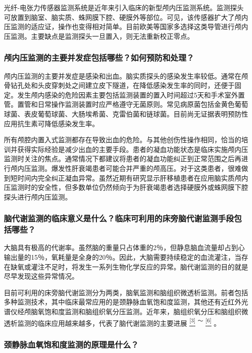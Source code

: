 光纤-电张力传感器监测系统是近年来引入临床的新型颅内压监测系统。监测探头可放置到脑室、脑实质、蛛网膜下腔、硬膜外等部位。可见，该传感器扩大了颅内压监测的适应证，操作也变得相对简单。目前欧美等国家多选择这类导管进行颅内压监测。主要缺点是监测探头一旦置入，则无法重新校正零点。

\subsubsection{颅内压监测的主要并发症包括哪些？如何预防和处理？}

颅内压监测的主要并发症是感染和出血。脑实质探头的感染发生率较低。通常在颅骨钻孔处和头皮穿刺处之间建立皮下隧道，在降低感染发生率的同时，还便于固定。发生颅内感染的危险因素主要包括监测装置的置入时间超过5天和手术室外置管。置管和日常操作监测装置时应严格遵守无菌原则。常见病原菌包括金黄色葡萄球菌、表皮葡萄球菌、大肠埃希菌、克雷伯菌和链球菌。目前尚无证据表明预防性应用抗生素可降低感染发生率。

所有颅腔内置入式监测都存在导致出血的危险。与其他创伤性操作相同，恰当的培训并获得实际经验是减少出血的主要手段。患者的凝血功能状态是临床实施颅内压监测时关注的焦点。通常情况下都建议将患者的凝血功能纠正到正常范围之后再进行颅内压监测。爆发性肝衰竭患者可能合并严重的颅高压。对于这类患者，很难做到短时间内完全纠正凝血异常。虽然近期有研究显示肝移植患者在应用脑实质颅内压监测时的安全性，但多数单位仍然倾向于为肝衰竭患者选择硬膜外或蛛网膜下腔探头进行颅内压监测。

\subsubsection{脑代谢监测的临床意义是什么？临床可利用的床旁脑代谢监测手段包括哪些？}

大脑具有极高的代谢率。虽然脑的重量只占体重的2％，但静息脑血流量却占到心输出量的15％，氧耗量是全身的20％。因此，大脑需要持续稳定的血流灌注，当存在缺氧或灌注不足时，将发生一系列生物化学反应的异常。脑代谢监测的目的就是尽早发现这些异常情况。

目前可利用的床旁脑代谢监测分为两类，脑氧监测和脑组织微透析监测。前者包括多种监测技术，其中临床最常应用的是颈静脉血氧饱和度监测，其他还有近红外光谱仪经颅脑氧饱和度监测和脑组织氧分压监测。近年来，脑组织氧分压和脑组织微透析监测的临床应用越来越多，代表了脑代谢监测的主要进展
\protect\hyperlink{text00029.htmlux5cux23ch3-28}{\textsuperscript{{[}3{]}}}
\textsuperscript{～}
\protect\hyperlink{text00029.htmlux5cux23ch6-28}{\textsuperscript{{[}6{]}}}
。

\subsubsection{颈静脉血氧饱和度监测的原理是什么？}

